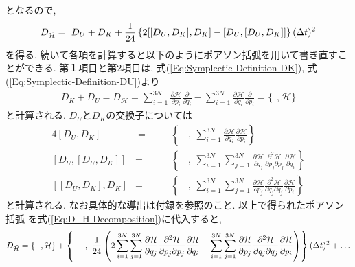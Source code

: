 となるので, 
\begin{align}
  D_{\Tilde{\mathcal{H}}}
  =~
  D_{U} + D_{K}
  +
  \frac{1}{24}
  \left\{
      2[[D_{U}, D_{K}], D_{K}]
      -[D_{U}, [D_{U}, D_{K}]]
  \right\}
  (\Delta t)^{2}
  \label{Eq:D_H-Decomposition}
\end{align}
を得る. 続いて各項を計算すると以下のようにポアソン括弧を用いて書き直すことができる.
第１項目と第2項目は, 式(\ref{Eq:Symplectic-Definition-DK}), 式(\ref{Eq:Symplectic-Definition-DU})より
\begin{align}
  D_{K} + D_{U}
  =
  D_{\mathcal{H}}
  =
  \sum_{i=1}^{3N}
  \frac{\partial \mathcal{H}}{\partial p_{i}}
  \frac{\partial}{\partial q_{i}}
  -
  \sum_{i=1}^{3N}
  \frac{\partial \mathcal{H}}{\partial q_{i}}
  \frac{\partial}{\partial p_{i}}
  =
  \{~~, \mathcal{H}\}
  \label{Eq:PoissonBracket-DK+DU}
\end{align}
と計算される. $D_{U}$と$D_{K}$の交換子については
\begin{alignat}{4}
  [D_{U}, D_{K}]
  &=
  -&&
  \left\{
    ~~~~,~
    \sum_{i=1}^{3N}
    \frac{\partial \mathcal{H}}{\partial q_{i}}
    \frac{\partial \mathcal{H}}{\partial p_{i}}
  \right\}
  \label{Eq:PoissonBracket-DU-DK}
  \\
  [D_{U}, [D_{U}, D_{K}]]
  &=&&
  \left\{
    ~~~~,~
    \sum_{i=1}^{3N} \sum_{j=1}^{3N}
    \frac{\partial \mathcal{H}}{\partial q_{j}}
    \frac{\partial^{2} \mathcal{H}}{\partial p_{j} \partial p_{j}}
    \frac{\partial \mathcal{H}}{\partial q_{i}}
  \right\}
  \label{Eq:PoissonBracket-DU-DU-DK}
  \\
  [[D_{U}, D_{K}], D_{K}]
  &=&&
  \left\{
    ~~~~,~
    \sum_{i=1}^{3N} \sum_{j=1}^{3N}
    \frac{\partial \mathcal{H}}{\partial p_{j}}
    \frac{\partial^{2} \mathcal{H}}{\partial q_{j} \partial q_{j}}
    \frac{\partial \mathcal{H}}{\partial p_{i}}
  \right\}
  \label{Eq:PoissonBracket-DU-DK-DK}
\end{alignat}
と計算される. なお具体的な導出は付録を参照のこと.
以上で得られたポアソン括弧
を式(\ref{Eq:D_H-Decomposition})に代入すると,
\begin{align}
  D_{\Tilde{\mathcal{H}}}
  =
  \{~~, \mathcal{H}\}
  +
  \left\{
    ~~~~,~
    \frac{1}{24}
    \left(
      2
      \sum_{i=1}^{3N} \sum_{j=1}^{3N}
      \frac{\partial \mathcal{H}}{\partial q_{j}}
      \frac{\partial^{2} \mathcal{H}}{\partial p_{j} \partial p_{j}}
      \frac{\partial \mathcal{H}}{\partial q_{i}}
    -
      \sum_{i=1}^{3N} \sum_{j=1}^{3N}
      \frac{\partial \mathcal{H}}{\partial p_{j}}
      \frac{\partial^{2} \mathcal{H}}{\partial q_{j} \partial q_{j}}
      \frac{\partial \mathcal{H}}{\partial p_{i}}
    \right)
  \right\}
  (\Delta t)^{2}
  +
  \ldots
\end{align}
